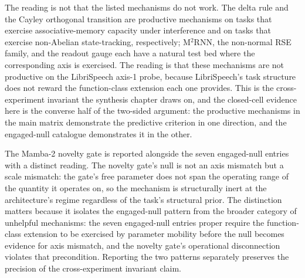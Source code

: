 The reading is not that the listed mechanisms do not work. The
delta rule and the Cayley orthogonal transition are productive
mechanisms on tasks that exercise associative-memory capacity under
interference and on tasks that exercise non-Abelian state-tracking,
respectively; M$^{2}$RNN, the non-normal RSE family, and the readout
gauge each have a natural test bed where the corresponding axis is
exercised. The reading is that these mechanisms are not productive
on the LibriSpeech axis-1 probe, because LibriSpeech's task structure
does not reward the function-class extension each one provides. This
is the cross-experiment invariant the synthesis chapter draws on,
and the closed-cell evidence here is the converse half of the
two-sided argument: the productive mechanisms in the main matrix
demonstrate the predictive criterion in one direction, and the
engaged-null catalogue demonstrates it in the other.

The Mamba-2 novelty gate is reported alongside the seven
engaged-null entries with a distinct reading. The novelty gate's
null is not an axis mismatch but a scale mismatch: the gate's free
parameter does not span the operating range of the quantity it
operates on, so the mechanism is structurally inert at the
architecture's regime regardless of the task's structural prior.
The distinction matters because it isolates the engaged-null
pattern from the broader category of unhelpful mechanisms: the
seven engaged-null entries proper require the function-class
extension to be exercised by parameter mobility before the null
becomes evidence for axis mismatch, and the novelty gate's
operational disconnection violates that precondition. Reporting the
two patterns separately preserves the precision of the
cross-experiment invariant claim.
